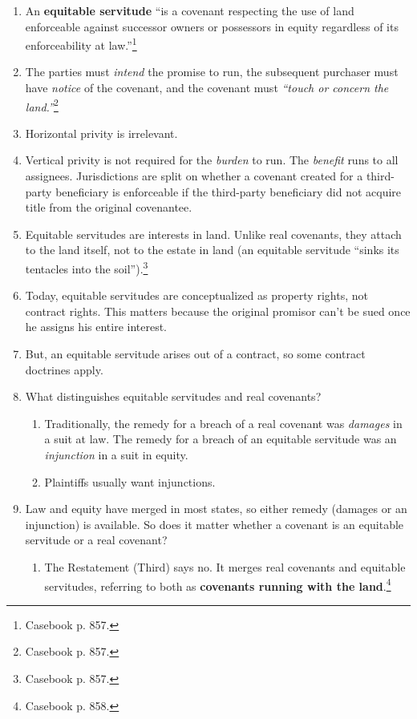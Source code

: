 \begin{enumerate}
    \item An \textbf{equitable servitude} ``is a covenant respecting the use 
    of land enforceable against successor owners or possessors in equity 
    regardless of its enforceability at law.''\footnote{Casebook p. 857.}
    \item The parties must \emph{intend} the promise to run, the subsequent 
    purchaser must have \emph{notice} of the covenant, and the covenant must 
    \emph{``touch or concern the land.''}\footnote{Casebook p. 857.}
    \item Horizontal privity is irrelevant.
    \item Vertical privity is not required for the \emph{burden} to run. The 
    \emph{benefit} runs to all assignees. Jurisdictions are split on whether a 
    covenant created for a third-party beneficiary is enforceable if the 
    third-party beneficiary did not acquire title from the original 
    covenantee.
    \item Equitable servitudes are interests in land. Unlike real covenants, 
    they attach to the land itself, not to the estate in land (an equitable 
    servitude ``sinks its tentacles into the soil'').\footnote{Casebook p. 
    857.}
    \item Today, equitable servitudes are conceptualized as property rights, 
    not contract rights. This matters because the original promisor can't be 
    sued once he assigns his entire interest.
    \item But, an equitable servitude arises out of a contract, so some 
    contract doctrines apply.
    \item What distinguishes equitable servitudes and real covenants?
    \begin{enumerate}
        \item Traditionally, the remedy for a breach of a real covenant was 
        \emph{damages} in a suit at law. The remedy for a breach of an 
        equitable servitude was an \emph{injunction} in a suit in equity.
        \item Plaintiffs usually want injunctions.
    \end{enumerate}
    \item Law and equity have merged in most states, so either remedy (damages 
    or an injunction) is available. So does it matter whether a covenant is an 
    equitable servitude or a real covenant?
    \begin{enumerate}
        \item The Restatement (Third) says no. It merges real covenants and 
        equitable servitudes, referring to both as \textbf{covenants running 
        with the land}.\footnote{Casebook p. 858.}
    \end{enumerate}
\end{enumerate}

